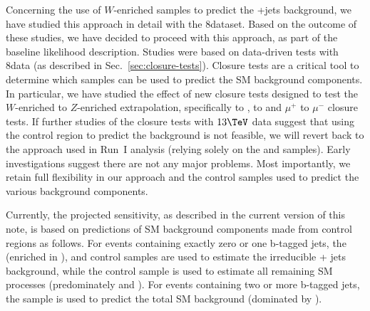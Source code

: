 Concerning the use of $W$-enriched samples to predict the \znunu +jets
background, we have studied this approach
in detail with the 8\TeV dataset. Based on the outcome of these studies,
we have decided to proceed with this approach, as part
of the baseline likelihood description. Studies were
based on data-driven tests with 8\TeV data
(as described in Sec.~\ref{sec:closure-tests}). Closure tests are a critical
tool to determine which samples can be used to predict the SM
background components. In particular, we have studied the effect of
new closure tests designed to test the $W$-enriched to $Z$-enriched
extrapolation, specifically \mj to \gj, \mj to \mmj
and $\mu^{+}$ to $\mu^{-}$ closure tests. 
If further studies of the closure tests with $13\tev$
data suggest that using the \mj control region to predict the \znunu
background is not feasible, we will revert back to the approach
used in Run~I analysis (\ie relying solely on the \zll and \gj
samples). Early investigations suggest there are not any major problems.
Most importantly, we retain full flexibility in our approach and the
control samples used to predict the various background components.

Currently, the projected sensitivity, as described in the current
version of this note, is based on predictions of SM background
components made from control regions as follows. For events containing
exactly zero or one b-tagged jets, the \mj (enriched in \wej), \gj and
\mmj control samples are used to estimate the irreducible \znunu + jets
background, while the \mj control sample is used to estimate all
remaining SM processes (predominately \wj and \ttbar). For events
containing two or more b-tagged jets, the \mj sample is
used to predict the total SM background (dominated by \ttbar).

